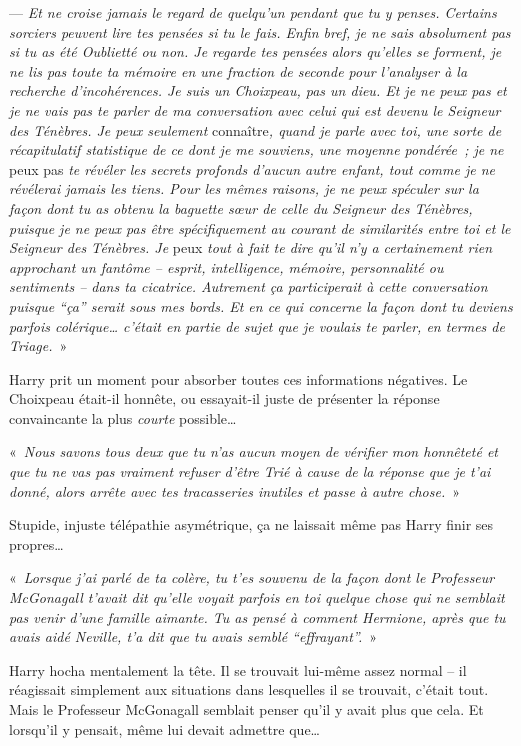 --- \emph{Et ne croise jamais le regard de quelqu'un pendant que tu y penses. Certains sorciers peuvent lire tes pensées si tu le fais. Enfin bref, je ne sais absolument pas si tu as été Oublietté ou non. Je regarde tes pensées alors qu'elles se forment, je ne lis pas toute ta mémoire en une fraction de seconde pour l'analyser à la recherche d'incohérences. Je suis un Choixpeau, pas un dieu. Et je ne peux pas et je ne vais pas te parler de ma conversation avec celui qui est devenu le Seigneur des Ténèbres. Je peux seulement} connaître\emph{, quand je parle avec toi, une sorte de récapitulatif statistique de ce dont je me souviens, une moyenne pondérée~; je ne} peux pas \emph{te révéler les secrets profonds d'aucun autre enfant, tout comme je ne révélerai jamais les tiens. Pour les mêmes raisons, je ne peux spéculer sur la façon dont tu as obtenu la baguette sœur de celle du Seigneur des Ténèbres, puisque je ne peux pas être spécifiquement au courant de similarités entre toi et le Seigneur des Ténèbres. Je} peux \emph{tout à fait te dire qu'il n'y a certainement rien approchant un fantôme -- esprit, intelligence, mémoire, personnalité ou sentiments -- dans ta cicatrice. Autrement ça participerait à cette conversation puisque “ça” serait sous mes bords. Et en ce qui concerne la façon dont tu deviens parfois colérique… c'était en partie de sujet que je voulais te parler, en termes de Triage.}~»

Harry prit un moment pour absorber toutes ces informations négatives. Le Choixpeau était-il honnête, ou essayait-il juste de présenter la réponse convaincante la plus \emph{courte} possible…

«~\emph{Nous savons tous deux que tu n'as aucun moyen de vérifier mon honnêteté et que tu ne vas pas vraiment refuser d'être Trié à cause de la réponse que je t'ai donné, alors arrête avec tes tracasseries inutiles et passe à autre chose.}~»

Stupide, injuste télépathie asymétrique, ça ne laissait même pas Harry finir ses propres…

«~\emph{Lorsque j'ai parlé de ta colère, tu t'es souvenu de la façon dont le Professeur McGonagall t'avait dit qu'elle voyait parfois en toi quelque chose qui ne semblait pas venir d'une famille aimante. Tu as pensé à comment Hermione, après que tu avais aidé Neville, t'a dit que tu avais semblé “effrayant”.}~»

Harry hocha mentalement la tête. Il se trouvait lui-même assez normal -- il réagissait simplement aux situations dans lesquelles il se trouvait, c'était tout. Mais le Professeur McGonagall semblait penser qu'il y avait plus que cela. Et lorsqu'il y pensait, même lui devait admettre que…

